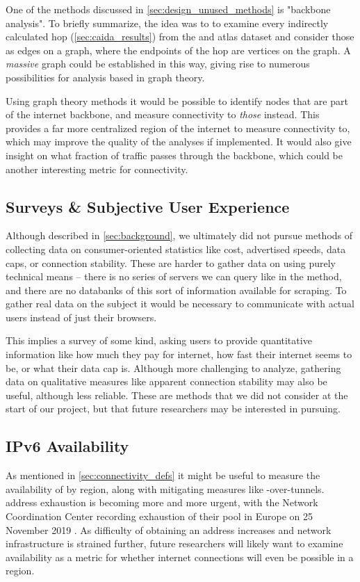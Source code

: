 One of the methods discussed in \cref{sec:design_unused_methods} is "backbone analysis". To briefly summarize, the idea was to to examine every indirectly calculated hop (\cref{sec:caida_results}) from the \caida and \ripe atlas dataset and consider those as edges on a graph, where the endpoints of the hop are vertices on the graph. A \textit{massive} graph could be established in this way, giving rise to numerous possibilities for analysis based in graph theory.

Using graph theory methods it would be possible to identify nodes that are part of the internet backbone, and measure connectivity to \textit{those} instead. This provides a far more centralized region of the internet to measure connectivity to, which may improve the quality of the analyses if implemented. It would also give insight on what fraction of traffic passes through the backbone, which could be another interesting metric for connectivity.

\subsection{Surveys \& Subjective User Experience}

Although described in \cref{sec:background}, we ultimately did not pursue methods of collecting data on consumer-oriented statistics like cost, advertised speeds, data caps, or connection stability. These are harder to gather data on using purely technical means -- there is no series of servers we can query like in the \dns method, and there are no databanks of this sort of information available for scraping. To gather real data on the subject it would be necessary to communicate with actual users instead of just their browsers.

This implies a survey of some kind, asking users to provide quantitative information like how much they pay for internet, how fast their internet seems to be, or what their data cap is. Although more challenging to analyze, gathering data on qualitative measures like apparent connection stability may also be useful, although less reliable. These are methods that we did not consider at the start of our project, but that future researchers may be interested in pursuing.

\subsection{IPv6 Availability}

As mentioned in \cref{sec:connectivity_defs} it might be useful to measure the availability of \ipvs by region, along with mitigating measures like \ipvs-over-\ipvf tunnels. \ipvf address exhaustion is becoming more and more urgent, with the \ripe Network Coordination Center recording exhaustion of their pool in Europe on 25 November 2019 \cite{ReseauxIPEuropeensNetworkCoordinationCentre2019a}. As difficulty of obtaining an \ipvf address increases and network infrastructure is strained further, future researchers will likely want to examine \ipvs availability as a metric for whether internet connections will even be possible in a region.
